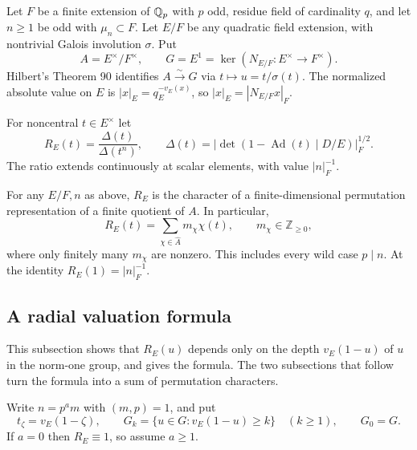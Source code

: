Let $F$ be a finite extension of $\mathbb Q_p$ with $p$ odd, residue field of cardinality $q$, and let $n\geq1$ be odd with $\mu_n\subset F$. Let $E/F$ be any quadratic field extension, with nontrivial Galois involution $\sigma$. Put
\[
 A=E^\times/F^\times,\qquad G=E^1=\ker(N_{E/F}:E^\times\to F^\times).
\]
Hilbert's Theorem 90 identifies $A\xrightarrow{\sim}G$ via $t\mapsto u=t/\sigma(t)$. The normalized absolute value on $E$ is $|x|_E=q_E^{-v_E(x)}$, so $|x|_E=|N_{E/F}x|_F$.

For noncentral $t\in E^\times$ let
\[
 R_E(t)=\frac{\Delta(t)}{\Delta(t^n)},\qquad
 \Delta(t)=\bigl|\det(1-\operatorname{Ad}(t)\mid D/E)\bigr|_F^{1/2}.
\]
The ratio extends continuously at scalar elements, with value $|n|_F^{-1}$.

\begin{theorem}\label{W:thm:main}
For any $E/F,n$ as above, $R_E$ is the character of a finite-dimensional permutation representation of a finite quotient of $A$. In particular,
\[
 R_E(t)=\sum_{\chi\in\widehat A}m_\chi\chi(t),\qquad m_\chi\in\mathbb Z_{\geq0},
\]
where only finitely many $m_\chi$ are nonzero. This includes every wild case $p\mid n$. At the identity $R_E(1)=|n|_F^{-1}$.
\end{theorem}

\subsection{A radial valuation formula}
This subsection shows that $R_E(u)$ depends only on the depth $v_E(1-u)$ of $u$ in the norm-one group, and gives the formula. The two subsections that follow turn the formula into a sum of permutation characters.

Write $n=p^a m$ with $(m,p)=1$, and put
\[
 t_\zeta=v_E(1-\zeta),\qquad
 G_k=\{u\in G:v_E(1-u)\geq k\}\quad(k\geq1),\qquad G_0=G.
\]
If $a=0$ then $R_E\equiv1$, so assume $a\geq1$.

